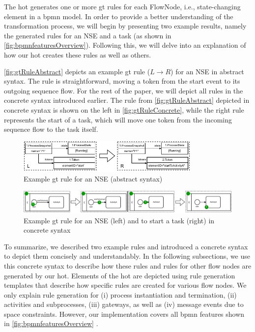 \documentclass[runningheads]{llncs}
\begin{document}
The \gls*{hot} generates one or more \gls*{gt} rules for each \textsf{FlowNode}, i.e., state-changing element in a \gls*{bpmn} model.
In order to provide a better understanding of the transformation process, we will begin by presenting two example results, namely the generated rules for an NSE and a task (as shown in \autoref{fig:bpmnfeaturesOverview}).
Following this, we will delve into an explanation of how our \gls*{hot} creates these rules as well as others.

\autoref{fig:gtRuleAbstract} depicts an example \gls*{gt} rule ($L \to R$) for an NSE in abstract syntax.
The rule is straightforward, moving a token from the start event to its outgoing sequence flow.
For the rest of the paper, we will depict all rules in the concrete syntax introduced earlier.
The rule from \autoref{fig:gtRuleAbstract} depicted in concrete syntax is shown on the left in \autoref{fig:gtRuleConcrete}, 
while the right rule  represents the start of a task, which will move one token from the incoming sequence flow to the task itself.

\begin{figure}[ht]
    \centering
  \includegraphics[width=0.8\textwidth]{images/rule_abstract.pdf}
  \caption{Example \gls*{gt} rule for an NSE (abstract syntax)}  \label{fig:gtRuleAbstract}
\end{figure}



\begin{figure}[ht]
    \centering
  \includegraphics[width=1\textwidth]{images/rule_concrete.pdf}
  \caption{Example \gls*{gt} rule for an NSE (left) and to start a task (right) in concrete syntax}
  \label{fig:gtRuleConcrete}
\end{figure}

To summarize, we described two example rules and introduced a concrete syntax to depict them concisely and understandably.
In the following subsections, we use this concrete syntax to describe how these rules and rules for other flow nodes are generated by our \gls*{hot}.
Elements of the \gls*{hot} are depicted using rule generation templates that describe how specific rules are created for various flow nodes.
We only explain rule generation for (i) process instantiation and termination, (ii) activities and subprocesses, (iii) gateways, as well as (iv) message events due to space constraints.
However, our implementation covers all \gls*{bpmn} features shown in \autoref{fig:bpmnfeaturesOverview} \cite{krauterArtifactsICGT2023}.
\end{document}
